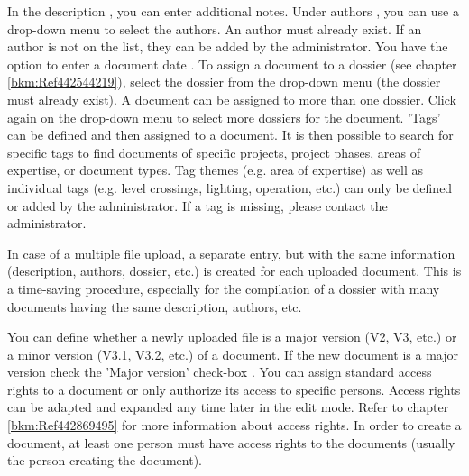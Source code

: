 \vspace{\baselineskip}

In the description , you can enter additional notes. Under authors , you can use a drop-down menu to select the authors. An author must already exist. If an author is not on the list, they can be added by the administrator. You have the option to enter a document date . To assign a document to a dossier (see chapter \ref{bkm:Ref442544219}), select the dossier from the drop-down menu  (the dossier must already exist). A document can be assigned to more than one dossier. Click again on the drop-down menu to select more dossiers for the document. 'Tags'  can be defined and then assigned to a document. It is then possible to search for specific tags to find documents of specific projects, project phases, areas of expertise, or document types. Tag themes (e.g. area of expertise) as well as individual tags (e.g. level crossings, lighting, operation, etc.) can only be defined or added by the administrator. If a tag is missing, please contact the administrator. \newline

In case of a multiple file upload, a separate entry, but with the same information (description, authors, dossier, etc.) is created for each uploaded document. This is a time-saving procedure, especially for the compilation of a dossier with many documents having the same description, authors, etc. \newline


You can define whether a newly uploaded file is a major version (V2, V3, etc.) or a minor version (V3.1, V3.2, etc.) of a document. If the new document is a major version check the 'Major version' check-box . You can assign standard access rights to a document  or only authorize its access to specific persons. Access rights can be adapted and expanded any time later in the edit mode. Refer to chapter \ref{bkm:Ref442869495} for more information about access rights. In order to create a document, at least one person must have access rights to the documents (usually the person creating the document).

